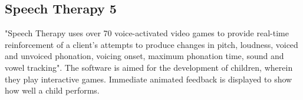 \subsection{Speech Therapy 5}
"Speech Therapy uses over 70 voice-activated video games to provide real-time reinforcement of a client's attempts to produce changes in pitch, loudness, voiced and unvoiced phonation, voicing onset, maximum phonation time, sound and vowel tracking"\cite{drspeech:nd:st5}. The software is aimed for the development of children, wherein they play interactive games. Immediate animated feedback is displayed to show how well a child performs.
